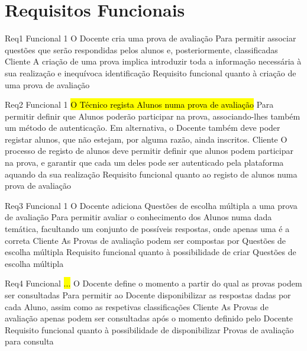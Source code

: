 \section*{Requisitos Funcionais}

{\TextoCor

\req
    {Req1} %
    {Funcional} %
    {1} %
    {O Docente cria uma prova de avaliação} %
    {Para permitir associar questões que serão respondidas pelos alunos e, posteriormente, classificadas} %
    {Cliente} %
    {A criação de uma prova implica introduzir toda a informação necessária à sua realização e inequívoca identificação} %
    {\prioMust} %
    {Requisito funcional quanto à criação de uma prova de avaliação} %

\req
    {Req2} %
    {Funcional} %
    {1} %
    {\hl{O Técnico regista Alunos numa prova de avaliação}} %
    {Para permitir definir que Alunos poderão participar na prova, associando-lhes também um método de autenticação. Em alternativa, o Docente também deve poder registar alunos, que não estejam, por alguma razão, ainda inscritos.} %
    {Cliente} %
    {O processo de registo de alunos deve permitir definir que alunos podem participar na prova, e garantir que cada um deles pode ser autenticado pela plataforma aquando da sua realização} %
    {\prioMust} %
    {Requisito funcional quanto ao registo de alunos numa prova de avaliação} %

\req
    {Req3} %
    {Funcional} %
    {1} %
    {O Docente adiciona Questões de escolha múltipla a uma prova de avaliação} %
    {Para permitir avaliar o conhecimento dos Alunos numa dada temática, facultando um conjunto de possíveis respostas, onde apenas uma é a correta} %
    {Cliente} %
    {As Provas de avaliação podem ser compostas por Questões de escolha múltipla} %
    {\prioMust} %
    {Requisito funcional quanto à possibilidade de criar Questões de escolha múltipla} %

\req
    {Req4} %
    {Funcional} %
    {\hl{...}} %
    {O Docente define o momento a partir do qual as provas podem ser consultadas} %
    {Para permitir ao Docente disponibilizar as respostas dadas por cada Aluno, assim como as respetivas classificações} %
    {Cliente} %
    {As Provas de avaliação apenas podem ser consultadas após o momento definido pelo Docente} %
    {\prioShould} %
    {Requisito funcional quanto à possibilidade de disponibilizar Provas de avaliação para consulta} %
}

